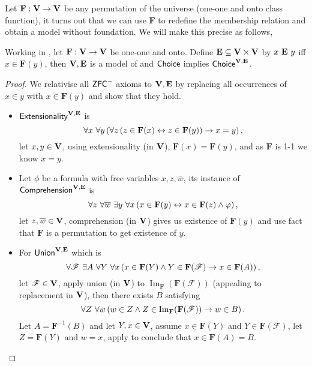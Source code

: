 \newcommand*{\F}{\mathbf{F}}
\renewcommand*{\Im}{\operatorname{Im}}
Let \(\mathbf{F}:\mathbf{V}\to\mathbf{V}\) be any permutation of the universe (one-one and onto class function),
it turns out that we can use \(\mathbf{F}\) to redefine the membership relation and obtain a model without foundation.
We will make this precise as follows,
\begin{lemma} %
    \label{KunenC4E18}
    Working in \ZFminus, let \(\mathbf{F}:\mathbf{V}\to\mathbf{V}\) be one-one and onto.
    Define \(\mathbf{E}\subseteq \mathbf{V}\times\mathbf{V}\) by \(x\ \mathbf{E}\ y\) iff \(x\in \mathbf{F}(y)\),
    then \(\mathbf{V},\mathbf{E}\) is a model of \ZFminus
    and \({\normalfont\textsf{Choice}}\) implies \({\normalfont\textsf{Choice}}^{\mathbf{V},\mathbf{E}}\).
\end{lemma}
\begin{proof}
    We relativise all \(\mbox{\normalfont \textsf{ZFC}}^-\) axioms to \(\mathbf{V},\mathbf{E}\) by replacing all occurrences of \(x\in y\) with \(x\in \F(y)\)
    and show that they hold.
    \begin{itemize}
        \item \(\textsf{Extensionality}^{\mathbf{V},\mathbf{E}}\) is
            \[ \forall x~\forall y \paren{
                    \forall z \paren{z\in \F(x) \leftrightarrow z\in \F(y)} \rightarrow x = y
            },\]
            let \(x, y\in \mathbf{V}\), using extensionality (in \(\mathbf{V}\)), \(\F(x) = \F(y)\), and as \(\F\) is 1-1 we know \(x = y\).

        \item Let \(\phi\) be a formula with free variables \(x,z,\overline{w}\), its instance of \(\textsf{Comprehension}^{\mathbf{V},\mathbf{E}}\) is
            \[ \forall z~\forall \overline{w}~\exists y~\forall x \paren{
                    x \in \F(y) \leftrightarrow x\in \F(z) \land \phi
            },\]
            let \(z,\overline{w}\in \mathbf{V}\), comprehension (in \(\mathbf{V}\)) gives us existence of \(\F(y)\) and use fact that \(\F\) is a permutation to get existence of \(y\).

        \item For \(\textsf{Union}^{\mathbf{V},\mathbf{E}}\) which is
            \[
                \forall \mathscr{F}~\exists A~\forall Y~\forall x\paren{x\in \F(Y)\land Y\in\F(\mathscr{F}) \rightarrow x\in\F(A)},
            \]
            let \(\mathscr{F}\in\mathbf{V}\),
            apply union (in \(\mathbf{V}\)) to \(\Im_{\F}(\F(\mathscr{F}))\) (appealing to replacement in \(\mathbf{V}\)),
            then there exists \(B\) satisfying
            \begin{equation}\label{c2:eqn:union}
                \forall Z~\forall w\paren{w\in Z\land Z\in \Im_{\F}(\F(\mathscr{F})) \rightarrow w\in B}.
            \end{equation}
            Let \(A = \F^{-1}(B)\) and let \(Y,x\in\mathbf{V}\), assume \(x\in \F(Y)\) and \(Y\in\F(\mathscr{F})\),
            let \(Z = \F(Y)\) and \(w = x\), apply  to conclude that \(x\in \F(A) = B\).


\end{itemize}
\end{proof}
